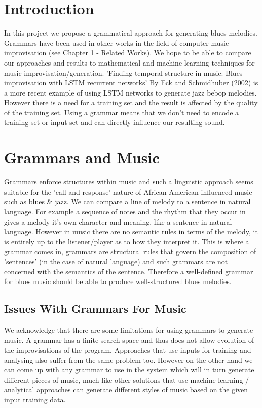 \documentclass[pdftex,12pt,a4paper]{report}
\begin{document}
\section{Introduction}
In this project we propose a grammatical approach for generating blues melodies. Grammars have been used in other works in the field of computer music improvisation (see Chapter 1 - Related Works). We hope to be able to compare our approaches and results to mathematical and machine learning techniques for music improvisation/generation. 'Finding temporal structure in music: Blues improvisation with LSTM recurrent networks' By Eck and Schmidhuber (2002) \cite{eck02} is a more recent example of using LSTM networks to generate jazz bebop melodies. However there is a need for a training set and the result is affected by the quality of the training set. Using a grammar means that we don't need to encode a training set or input set and can directly influence our resulting sound.

\section{Grammars and Music}
Grammars enforce structures within music and such a linguistic approach seems suitable for the 'call and response' nature of African-American influenced music such as blues \& jazz. We can compare a line of melody to a sentence in natural language. For example a sequence of notes and the rhythm that they occur in gives a melody it's own character and meaning, like a sentence in natural language. However in music there are no semantic rules in terms of the melody, it is entirely up to the listener/player as to how they interpret it. This is where a grammar comes in, grammars are structural rules that govern the composition of 'sentences' (in the case of natural language) and such grammars are not concerned with the semantics of the sentence. Therefore a well-defined grammar for blues music should be able to produce well-structured blues melodies.

\subsection{Issues With Grammars For Music}
We acknowledge that there are some limitations for using grammars to generate music. A grammar has a finite search space and thus does not allow evolution of the improvisations of the program. Approaches that use inputs for training and analysing also suffer from the same problem too. However on the other hand we can come up with any grammar to use in the system which will in turn generate different pieces of music, much like other solutions that use machine learning / analytical approaches can generate different styles of music based on the given input training data.
\end{document}
